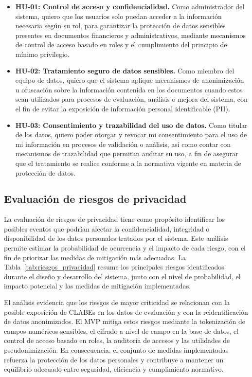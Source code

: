 \begin{itemize}
    \item \textbf{HU-01: Control de acceso y confidencialidad.}  
    Como administrador del sistema, quiero que los usuarios solo puedan acceder a la información necesaria según su rol, para garantizar la protección de datos sensibles presentes en documentos financieros y administrativos, mediante mecanismos de control de acceso basado en roles y el cumplimiento del principio de mínimo privilegio.

    \item \textbf{HU-02: Tratamiento seguro de datos sensibles.}  
    Como miembro del equipo de datos, quiero que el sistema aplique mecanismos de anonimización u ofuscación sobre la información contenida en los documentos cuando estos sean utilizados para procesos de evaluación, análisis o mejora del sistema, con el fin de evitar la exposición de información personal identificable (PII).

    \item \textbf{HU-03: Consentimiento y trazabilidad del uso de datos.}  
    Como titular de los datos, quiero poder otorgar y revocar mi consentimiento para el uso de mi información en procesos de validación o análisis, así como contar con mecanismos de trazabilidad que permitan auditar su uso, a fin de asegurar que el tratamiento se realice conforme a la normativa vigente en materia de protección de datos.
\end{itemize}
\subsection{Evaluación de riesgos de privacidad}

La evaluación de riesgos de privacidad tiene como propósito identificar los posibles eventos que podrían afectar la confidencialidad, integridad o disponibilidad de los datos personales tratados por el sistema. Este análisis permite estimar la probabilidad de ocurrencia y el impacto de cada riesgo, con el fin de priorizar las medidas de mitigación más adecuadas. La Tabla~\ref{tab:riesgos_privacidad} resume los principales riesgos identificados durante el diseño y desarrollo del sistema, junto con el nivel de probabilidad, el impacto potencial y las medidas de mitigación implementadas.

El análisis evidencia que los riesgos de mayor criticidad se relacionan con la posible exposición de CLABEs en los datos de evaluación y con la reidentificación de datos anonimizados. El MVP mitiga estos riesgos mediante la tokenización de campos numéricos sensibles, el cifrado a nivel de campo en la base de datos, el control de acceso basado en roles, la auditoría de accesos y las utilidades de pseudonimización. En consecuencia, el conjunto de medidas implementadas refuerza la protección de los datos personales y contribuye a mantener un equilibrio adecuado entre seguridad, eficiencia y cumplimiento normativo.

